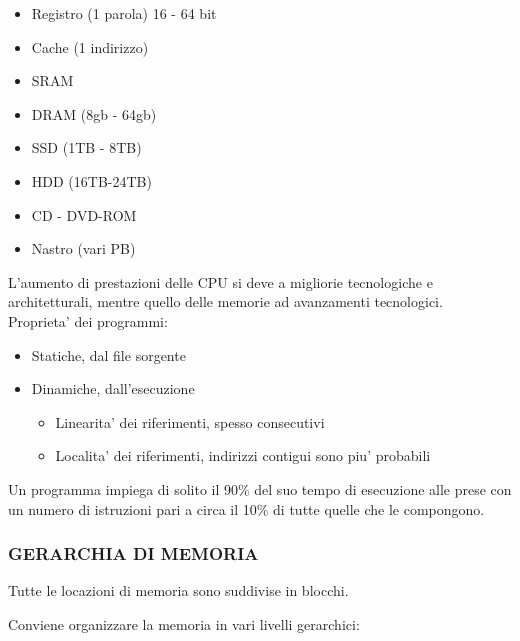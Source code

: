 \documentclass[12pt, a4paper]{article}
\begin{document}
\begin{itemize}
	\item Registro (1 parola) 16 - 64 bit
	\item Cache (1 indirizzo)
	\item SRAM
	\item DRAM (8gb - 64gb)
	\item SSD (1TB - 8TB)
	\item HDD (16TB-24TB)
	\item CD - DVD-ROM
	\item Nastro (vari PB)
\end{itemize}
L'aumento di prestazioni delle CPU si deve a migliorie tecnologiche e architetturali, mentre
quello delle memorie  ad avanzamenti tecnologici.\\
Proprieta' dei programmi: 

\begin{itemize}
	\item Statiche, dal file sorgente
	\item Dinamiche, dall'esecuzione
		\begin{itemize}
			\item Linearita' dei riferimenti, spesso consecutivi
			\item Localita' dei riferimenti, indirizzi contigui sono piu' probabili
		\end{itemize}
\end{itemize}

\begin{defn}[Congettura 90/10]
Un programma impiega di solito il 90\% del suo tempo di esecuzione alle prese 
con un numero di istruzioni pari a circa il 10\% di tutte quelle che le compongono.
\end{defn}

\subsubsection{GERARCHIA DI MEMORIA}
Tutte le locazioni di memoria sono suddivise in blocchi. \newline

Conviene organizzare la memoria in vari livelli gerarchici:
\end{document}
